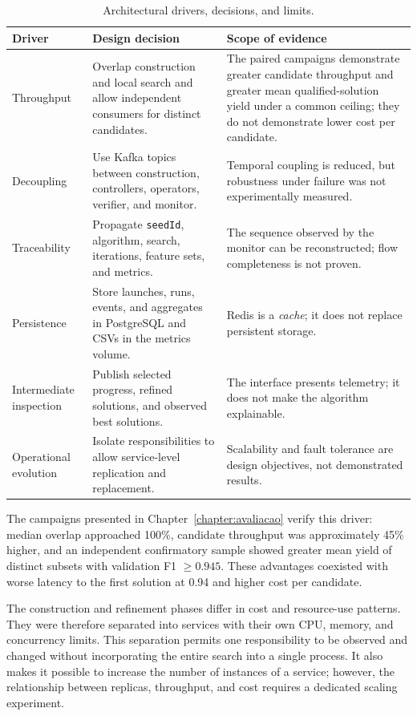 \begin{table}[!htb]
  \centering
  \small
  \caption{Architectural drivers, decisions, and limits.}
  \label{tab:architecture-drivers}
  \begin{tabularx}{\linewidth}{@{}p{.18\linewidth}X X@{}}
    \toprule
    \textbf{Driver} & \textbf{Design decision} & \textbf{Scope of evidence} \\
    \midrule
    Throughput & Overlap construction and local search and allow independent consumers for distinct candidates. & The paired campaigns demonstrate greater candidate throughput and greater mean qualified-solution yield under a common ceiling; they do not demonstrate lower cost per candidate. \\
    Decoupling & Use Kafka topics between construction, controllers, operators, verifier, and monitor. & Temporal coupling is reduced, but robustness under failure was not experimentally measured. \\
    Traceability & Propagate \texttt{seedId}, algorithm, search, iterations, feature sets, and metrics. & The sequence observed by the monitor can be reconstructed; flow completeness is not proven. \\
    Persistence & Store launches, runs, events, and aggregates in PostgreSQL and CSVs in the metrics volume. & Redis is a \textit{cache}; it does not replace persistent storage. \\
    Intermediate inspection & Publish selected progress, refined solutions, and observed best solutions. & The interface presents telemetry; it does not make the algorithm explainable. \\
    Operational evolution & Isolate responsibilities to allow service-level replication and replacement. & Scalability and fault tolerance are design objectives, not demonstrated results. \\
    \bottomrule
  \end{tabularx}
\end{table}

The campaigns presented in Chapter~\ref{chapter:avaliacao} verify this driver: median overlap approached 100\%, candidate throughput was approximately 45\% higher, and an independent confirmatory sample showed greater mean yield of distinct subsets with validation F1 $\geq 0.945$. These advantages coexisted with worse latency to the first solution at 0.94 and higher cost per candidate.

The construction and refinement phases differ in cost and resource-use patterns. They were therefore separated into services with their own CPU, memory, and concurrency limits. This separation permits one responsibility to be observed and changed without incorporating the entire search into a single process. It also makes it possible to increase the number of instances of a service; however, the relationship between replicas, throughput, and cost requires a dedicated scaling experiment.

